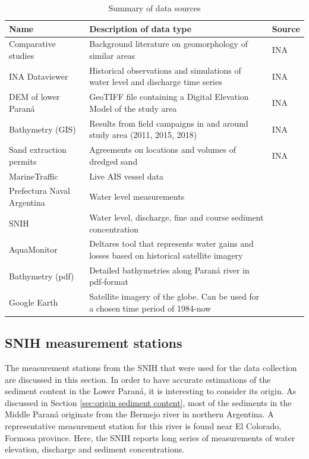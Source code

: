 \begin{table}[H]
    \centering
    \renewcommand{\arraystretch}{1.2} %
    \setlength{\tabcolsep}{4pt}
    \caption{Summary of data sources}%
    \begin{tabularx}{\textwidth}{p{3.5cm}p{8cm}p{3.5cm}}
        \toprule
        Name & Description of data type & Source \\
        \midrule
        Comparative studies  & Background literature on geomorphology of similar areas & INA   \\
        INA Dataviewer         & Historical observations and simulations of water level and discharge time series & INA  \\
        DEM of lower Paraná & GeoTIFF file containing a Digital Elevation Model of the study area & INA \\
        Bathymetry (GIS) & Results from field campaigns in and around study area (2011, 2015, 2018) & INA \\
        Sand extraction permits & Agreements on locations and volumes of dredged sand & INA \\
        MarineTraffic & Live AIS vessel data & \cite{marinetraffic2025} \\
        Prefectura Naval Argentina  & Water level measurements & \cite{prefecturanaval2025} \\
        SNIH & Water level, discharge, fine and course sediment concentration & \cite{snih2025} \\
        AquaMonitor & Deltares tool that represents water gains and losses based on historical satellite imagery & \cite{aquaMonitor2025} \\
        Bathymetry (pdf) & Detailed bathymetries along Paraná river in pdf-format & \cite{agencianacionaldepuertosynavegacionNavegableTroncal2025} \\
        Google Earth & Satellite imagery of the globe. Can be used for a chosen time period of 1984-now & \cite{googleearth2025}  \\
        \bottomrule
    \end{tabularx}
    \label{tab:data collection summary}
\end{table}

\subsection{SNIH measurement stations}
\label{sec:measurementstations}
The measurement stations from the SNIH that were used for the data collection are discussed in this section. In order to have accurate estimations of the sediment content in the Lower Paraná, it is interesting to consider its origin. As discussed in Section \ref{sec:origin sediment content}, most of the sediments in the Middle Paraná originate from the Bermejo river in northern Argentina. A representative measurement station for this river is found near El Colorado, Formosa province. Here, the SNIH reports long series of measurements of water elevation, discharge and sediment concentrations.

